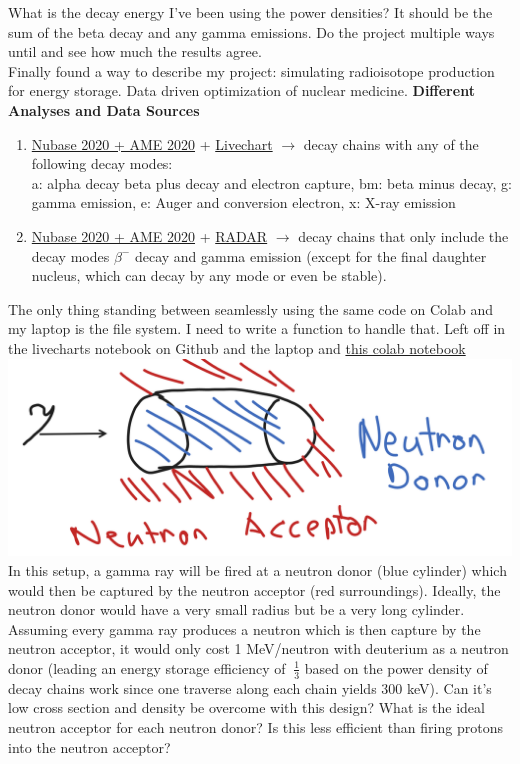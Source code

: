\documentclass[12pt]{article}
\begin{document}
What is the decay energy I've been using the power densities? It should be the sum of the beta decay and any gamma emissions. Do the project multiple ways until and see how much the results agree.\\
Finally found a way to describe my project: simulating radioisotope production for energy storage. Data driven optimization of nuclear medicine. 
\textbf{Different Analyses and Data Sources}
\begin{enumerate}
    \item \href{https://www-nds.iaea.org/amdc/}{Nubase 2020 + AME 2020} + \href{https://nds.iaea.org/relnsd/vcharthtml/api_v0_guide.html}{Livechart} $\to$ decay chains with any of the following decay modes: \\
    a: alpha decay beta plus decay and electron capture, bm: beta minus decay, g: gamma emission, e: Auger and conversion electron, x: X-ray emission
    \item \href{https://www-nds.iaea.org/amdc/}{Nubase 2020 + AME 2020} + \href{https://www.doseinfo-radar.com/RADARDecay.html}{RADAR} $\to$ decay chains that only include the decay modes $\beta^-$ decay and gamma emission (except for the final daughter nucleus, which can decay by any mode or even be stable).
\end{enumerate}
The only thing standing between seamlessly using the same code on Colab and my laptop is the file system. I need to write a function to handle that. Left off in the livecharts notebook on Github and the laptop and  \href{https://colab.research.google.com/drive/1rXPnMapuznZOmF3p908jdk1eiosalbjV?usp=sharing}{this colab notebook}\\
\includegraphics[scale=.4]{Images/concept setup.PNG}\\
In this setup, a gamma ray will be fired at a neutron donor (blue cylinder) which would then be captured by the neutron acceptor (red surroundings). Ideally, the neutron donor would have a very small radius but be a very long cylinder. Assuming every gamma ray produces a neutron which is then capture by the neutron acceptor, it would only cost 1 MeV/neutron with deuterium as a neutron donor (leading an energy storage efficiency of $~\frac{1}{3}$ based on the power density of decay chains work since one traverse along each chain yields $300$ keV). Can it's low cross section and density be overcome with this design? What is the ideal neutron acceptor for each neutron donor? Is this less efficient than firing protons into the neutron acceptor? 
\end{document}

